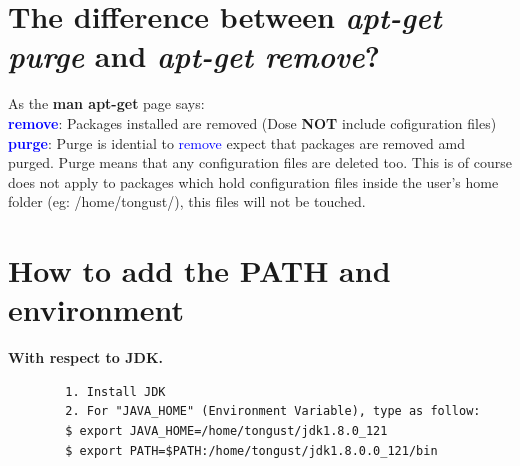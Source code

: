 \documentclass[a4paper, 12pt]{article}
\begin{document}
    \section{The difference between \textit{apt-get purge} and \textit{apt-get remove}?}
    As the \textbf{man apt-get} page says:\\
    \textbf{\textcolor{blue}{remove}}: Packages installed are removed (Dose \textbf{NOT} include cofiguration files)\\
    \textbf{\textcolor{blue}{purge}}: Purge is idential to \textcolor{blue}{remove} expect
    that packages are removed amd purged. Purge means that any configuration files are deleted too.
    This is of course does not apply to packages which hold configuration files inside the user's home 
    folder (eg: /home/tongust/), this files will not be touched.\\
    
    \section{How to add the \textbf{PATH} and environment}
    \textbf{With respect to JDK. }\\
    \begin{verbatim}
        1. Install JDK
        2. For "JAVA_HOME" (Environment Variable), type as follow:
        $ export JAVA_HOME=/home/tongust/jdk1.8.0_121
        $ export PATH=$PATH:/home/tongust/jdk1.8.0.0_121/bin
    \end{verbatim}
\end{document}
